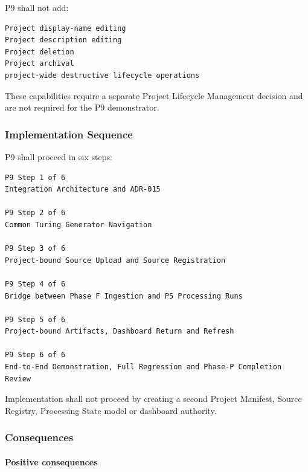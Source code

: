 P9 shall not add:

\begin{verbatim}
Project display-name editing
Project description editing
Project deletion
Project archival
project-wide destructive lifecycle operations
\end{verbatim}

These capabilities require a separate Project Lifecycle Management decision and are not required for the P9 demonstrator.

\hypertarget{implementation-sequence-2}{%
\subsubsection{Implementation Sequence}\label{implementation-sequence-2}}

P9 shall proceed in six steps:

\begin{verbatim}
P9 Step 1 of 6
Integration Architecture and ADR-015

P9 Step 2 of 6
Common Turing Generator Navigation

P9 Step 3 of 6
Project-bound Source Upload and Source Registration

P9 Step 4 of 6
Bridge between Phase F Ingestion and P5 Processing Runs

P9 Step 5 of 6
Project-bound Artifacts, Dashboard Return and Refresh

P9 Step 6 of 6
End-to-End Demonstration, Full Regression and Phase-P Completion Review
\end{verbatim}

Implementation shall not proceed by creating a second Project Manifest, Source Registry, Processing State model or dashboard authority.

\hypertarget{consequences}{%
\subsubsection{Consequences}\label{consequences}}

\hypertarget{positive-consequences-1}{%
\paragraph{Positive consequences}\label{positive-consequences-1}}

